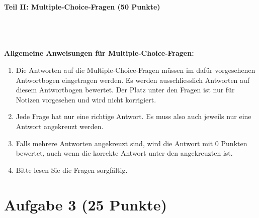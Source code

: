 \begin{Large}
\textbf{Teil II: Multiple-Choice-Fragen (50 Punkte)}
\end{Large}
\\
\\
\\
\textbf{Allgemeine Anweisungen für Multiple-Choice-Fragen:}
\\
\renewcommand{\labelenumi}{(\roman{enumi})}
\begin{enumerate}
\item
Die Antworten auf die Multiple-Choice-Fragen müssen im dafür vorgesehenen Antwortbogen eingetragen werden. Es werden ausschliesslich Antworten auf diesem Antwortbogen bewertet. Der
Platz unter den Fragen ist nur für Notizen vorgesehen und wird nicht korrigiert.

\item
Jede Frage hat nur eine richtige Antwort. Es muss also auch jeweils nur eine Antwort angekreuzt
werden.

\item
Falls mehrere Antworten angekreuzt sind, wird die Antwort mit 0 Punkten bewertet, auch wenn
die korrekte Antwort unter den angekreuzten ist.

\item
Bitte lesen Sie die Fragen sorgfältig.

\end{enumerate}

\newpage



\section*{Aufgabe 3 (25 Punkte) }
\vspace{0.4cm}
